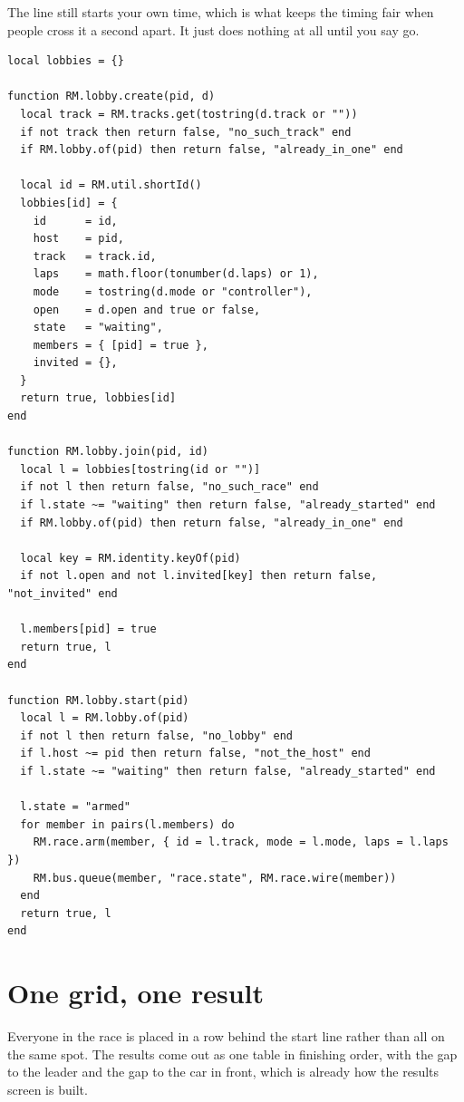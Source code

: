 \documentclass[11pt,a4paper]{article}
\begin{document}
The line still starts your own time, which is what keeps the timing fair when
people cross it a second apart. It just does nothing at all until you say go.

\begin{lstlisting}
local lobbies = {}

function RM.lobby.create(pid, d)
  local track = RM.tracks.get(tostring(d.track or ""))
  if not track then return false, "no_such_track" end
  if RM.lobby.of(pid) then return false, "already_in_one" end

  local id = RM.util.shortId()
  lobbies[id] = {
    id      = id,
    host    = pid,
    track   = track.id,
    laps    = math.floor(tonumber(d.laps) or 1),
    mode    = tostring(d.mode or "controller"),
    open    = d.open and true or false,
    state   = "waiting",
    members = { [pid] = true },
    invited = {},
  }
  return true, lobbies[id]
end

function RM.lobby.join(pid, id)
  local l = lobbies[tostring(id or "")]
  if not l then return false, "no_such_race" end
  if l.state ~= "waiting" then return false, "already_started" end
  if RM.lobby.of(pid) then return false, "already_in_one" end

  local key = RM.identity.keyOf(pid)
  if not l.open and not l.invited[key] then return false, "not_invited" end

  l.members[pid] = true
  return true, l
end

function RM.lobby.start(pid)
  local l = RM.lobby.of(pid)
  if not l then return false, "no_lobby" end
  if l.host ~= pid then return false, "not_the_host" end
  if l.state ~= "waiting" then return false, "already_started" end

  l.state = "armed"
  for member in pairs(l.members) do
    RM.race.arm(member, { id = l.track, mode = l.mode, laps = l.laps })
    RM.bus.queue(member, "race.state", RM.race.wire(member))
  end
  return true, l
end
\end{lstlisting}

\section{One grid, one result}

Everyone in the race is placed in a row behind the start line rather than all
on the same spot. The results come out as one table in finishing order, with
the gap to the leader and the gap to the car in front, which is already how the
results screen is built.
\end{document}
